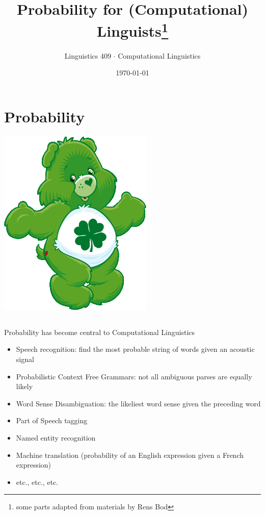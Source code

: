 \documentclass[9pt,xcolor=pdftex,dvipsnames,table]{beamer}
\title{Probability for (Computational) Linguists\footnote{some parts adapted from materials by Rens Bod}}
\subtitle{}
\author{Linguistics 409 $\cdot$ Computational Linguistics}
\institute{Rice University}
\date[]{{\small \today}}
\begin{document}

\section{Probability}

\begin{frame}

	\titlepage
	\begin{center}
		\includegraphics[width=.2\paperwidth]{bear}	
	\end{center}
\end{frame}

\subsection{}
\begin{frame}{Probability has become central to Computational Linguistics}
	\begin{itemize}
		\item Speech recognition: find the most probable string of words given an acoustic signal
		\item Probabilistic Context Free Grammars: not all ambiguous parses are equally likely
		\item Word Sense Disambiguation: the likeliest word sense given the preceding word
		\item Part of Speech tagging
		\item Named entity recognition
		\item Machine translation (probability of an English expression given a French expression)
		\item etc., etc., etc.
	\end{itemize}
\end{frame}
\end{document}
